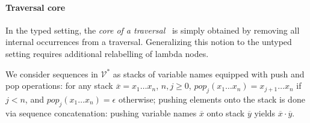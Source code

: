 \documentclass{elsarticle}
\theoremstyle{plain}
\theoremstyle{definition}
\newcommand\VarSet{\mathcal{V}}
\begin{document}
\paragraph{Traversal core}

In the typed setting, the \emph{core of a traversal}~\cite{BlumPhd} is simply obtained by removing all internal occurrences from a traversal.
Generalizing this notion to the untyped setting requires
additional relabelling of lambda nodes.

We consider sequences in $\VarSet^*$ as stacks of variable names equipped with  push and pop operations: for any stack $\overline{x} = x_1 \ldots x_n$, $n,j\geq0$, $pop_j (x_1 \ldots x_n) = x_{j+1} \ldots x_n$ if $j<n$, and $pop_j (x_1 \ldots x_n) = \epsilon$ otherwise;
pushing elements onto the stack is done via sequence concatenation:
 pushing  variable names $\overline{x}$
 onto stack $\overline{y}$ yields  $\overline{x} \cdot \overline{y}$.
\end{document}
